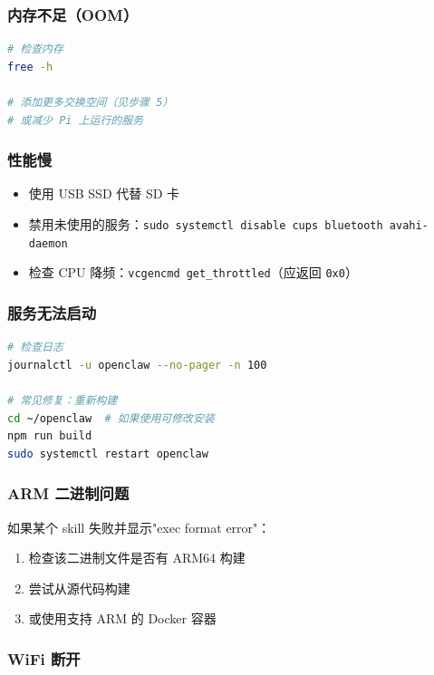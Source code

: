 \subsubsection{内存不足（OOM）}


\begin{lstlisting}[language=bash]
# 检查内存
free -h

# 添加更多交换空间（见步骤 5）
# 或减少 Pi 上运行的服务
\end{lstlisting}


\subsubsection{性能慢}


\begin{itemize}
  \item 使用 USB SSD 代替 SD 卡
  \item 禁用未使用的服务：\texttt{sudo systemctl disable cups bluetooth avahi-daemon}
  \item 检查 CPU 降频：\texttt{vcgencmd get\_throttled}（应返回 \texttt{0x0}）
\end{itemize}


\subsubsection{服务无法启动}


\begin{lstlisting}[language=bash]
# 检查日志
journalctl -u openclaw --no-pager -n 100

# 常见修复：重新构建
cd ~/openclaw  # 如果使用可修改安装
npm run build
sudo systemctl restart openclaw
\end{lstlisting}


\subsubsection{ARM 二进制问题}


如果某个 skill 失败并显示"exec format error"：

\begin{enumerate}
  \item 检查该二进制文件是否有 ARM64 构建
  \item 尝试从源代码构建
  \item 或使用支持 ARM 的 Docker 容器
\end{enumerate}


\subsubsection{WiFi 断开}


